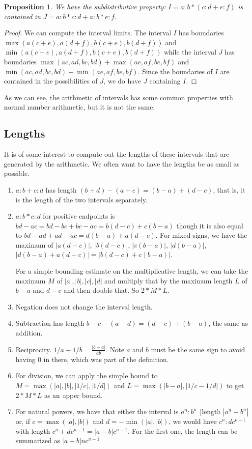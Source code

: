 \documentclass[12pt]{article}
\newtheorem{proposition}{Proposition}
\theoremstyle{remark}
\begin{document}
\begin{proposition}
We have the subdistributive property: $I = a:b*(c:d + e:f)$ is contained in $J = a:b*c:d + a:b*e:f$. 
\end{proposition}

\begin{proof}
We can compute the interval limits. The interval $I$ has boundaries $\max(a(c+e), a(d+f), b(c+e), b(d+f))$ and $\min(a(c+e), a(d+f), b(c+e), b(d+f))$ while the interval $J$ has boundaries $\max(ac, ad, bc, bd) + \max(ae, af, be, bf)$ and $\min(ac, ad, bc, bd) + \min(ae, af, be, bf)$. Since the boundaries of $I$ are contained in the possibilities of $J$, we do have $J$ containing $I$.
\end{proof}

As we can see, the arithmetic of intervals has some common properties with normal number arithmetic, but it is not the same.

\subsection{Lengths}

It is of some interest to compute out the lengths of these intervals that are generated by the arithmetic. We often want to have the lengths be as small as possible. 

\begin{enumerate}
    \item $a:b + c:d$ has length $(b+d) - (a+c) = (b-a) + (d-c)$, that is, it is the length of the two intervals separately. 
    \item $a:b*c:d$ for positive endpoints is $bd-ac = bd -bc + bc -ac =  b(d-c) + c(b-a)$ though it is also equal to $bd - ad + ad - ac = d(b-a) + a(d-c)$. For mixed signs, we have the maximum of $|a(d-c)|$, $|b(d-c)|$, $|c(b-a)|$, $|d(b-a)|$, $|d(b-a)+a(d-c)| = |b(d-c) + c(b-a)|$. 
    
    For a simple bounding estimate on the multiplicative length, we can take the maximum $M$ of $|a|, |b|, |c|, |d|$ and multiply that by the maximum length $L$ of $b-a$ and $d-c$ and then double that. So $2*M*L$. 
    \item Negation does not change the interval length. 
    \item Subtraction has length $b-c - (a-d) = (d-c) + (b-a)$, the same as addition.
    \item Reciprocity. $1/a - 1/b = \tfrac{|b-a|}{ab}$. Note $a$ and $b$ must be the same sign to avoid having 0 in there, which was part of the definition.
    \item For division, we can apply the simple bound to $M = \max(|a|, |b|, |1/c|, |1/d|)$ and $L= \max(|b-a|, |1/c - 1/d|)$ to get $2*M*L$ as an upper bound. 
    \item For natural powers, we have that either the interval is $a^n:b^n$ (length $|a^n-b^n|$ or, if $c = \max(|a|, |b|)$ and $d=-\min(|a|,|b|)$, we would have $c^n : d c^{n-1}$ with length $c^n + d c^{n-1}= |a-b|c^{n-1}$. For the first one, the length can be summarized as $|a-b|n c^{n-1} $
\end{enumerate}
\end{document}
